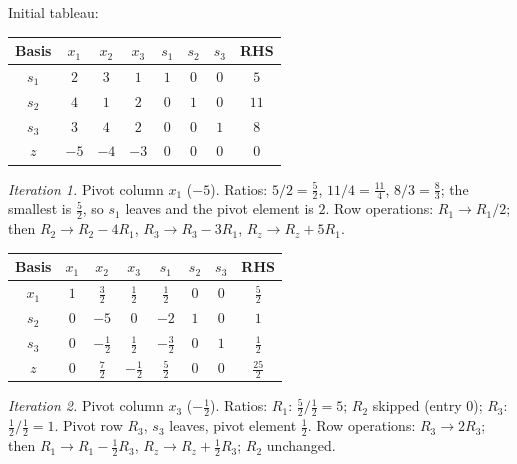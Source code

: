 \begin{solutions}
  \item Initial tableau:
        \begin{center}
        \begin{tabular}{c|cccccc|c}
        Basis & $x_1$ & $x_2$ & $x_3$ & $s_1$ & $s_2$ & $s_3$ & RHS\\
        \hline
        $s_1$ & $2$ & $3$ & $1$ & $1$ & $0$ & $0$ & $5$\\
        $s_2$ & $4$ & $1$ & $2$ & $0$ & $1$ & $0$ & $11$\\
        $s_3$ & $3$ & $4$ & $2$ & $0$ & $0$ & $1$ & $8$\\
        \hline
        $z$ & $-5$ & $-4$ & $-3$ & $0$ & $0$ & $0$ & $0$\\
        \end{tabular}
        \end{center}
        \emph{Iteration 1.} Pivot column $x_1$ ($-5$). Ratios:
        $5/2=\tfrac{5}{2}$, $11/4=\tfrac{11}{4}$, $8/3=\tfrac{8}{3}$;
        the smallest is $\tfrac{5}{2}$, so $s_1$ leaves and the pivot
        element is $2$. Row operations: $R_1\to R_1/2$; then
        $R_2\to R_2-4R_1$, $R_3\to R_3-3R_1$, $R_z\to R_z+5R_1$.
        \begin{center}
        \begin{tabular}{c|cccccc|c}
        Basis & $x_1$ & $x_2$ & $x_3$ & $s_1$ & $s_2$ & $s_3$ & RHS\\
        \hline
        $x_1$ & $1$ & $\tfrac{3}{2}$ & $\tfrac{1}{2}$ & $\tfrac{1}{2}$ & $0$ & $0$ & $\tfrac{5}{2}$\\
        $s_2$ & $0$ & $-5$ & $0$ & $-2$ & $1$ & $0$ & $1$\\
        $s_3$ & $0$ & $-\tfrac{1}{2}$ & $\tfrac{1}{2}$ & $-\tfrac{3}{2}$ & $0$ & $1$ & $\tfrac{1}{2}$\\
        \hline
        $z$ & $0$ & $\tfrac{7}{2}$ & $-\tfrac{1}{2}$ & $\tfrac{5}{2}$ & $0$ & $0$ & $\tfrac{25}{2}$\\
        \end{tabular}
        \end{center}
        \emph{Iteration 2.} Pivot column $x_3$ ($-\tfrac{1}{2}$).
        Ratios: $R_1$: $\tfrac{5}{2}\big/\tfrac{1}{2}=5$; $R_2$ skipped
        (entry $0$); $R_3$: $\tfrac{1}{2}\big/\tfrac{1}{2}=1$. Pivot row
        $R_3$, $s_3$ leaves, pivot element $\tfrac{1}{2}$. Row
        operations: $R_3\to 2R_3$; then $R_1\to R_1-\tfrac{1}{2}R_3$,
        $R_z\to R_z+\tfrac{1}{2}R_3$; $R_2$ unchanged.
        \begin{center}
        \begin{tabular}{c|cccccc|c}

\end{tabular}
\end{center}
\end{solutions}
